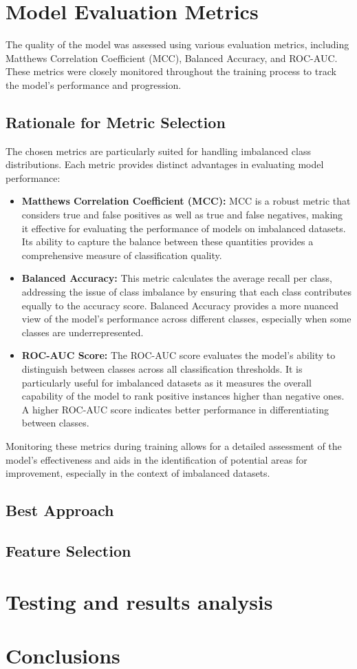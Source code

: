 \documentclass[10pt,twocolumn,letterpaper]{article}
\begin{document}
\section{Model Evaluation Metrics}

The quality of the model was assessed using various evaluation metrics, including Matthews Correlation Coefficient (MCC), Balanced Accuracy, and ROC-AUC. These metrics were closely monitored throughout the training process to track the model's performance and progression.

\subsection{Rationale for Metric Selection}

The chosen metrics are particularly suited for handling imbalanced class distributions. Each metric provides distinct advantages in evaluating model performance:

\begin{itemize}
    \item \textbf{Matthews Correlation Coefficient (MCC):} MCC is a robust metric that considers true and false positives as well as true and false negatives, making it effective for evaluating the performance of models on imbalanced datasets. 
    Its ability to capture the balance between these quantities provides a comprehensive measure of classification quality.
    \item \textbf{Balanced Accuracy:} This metric calculates the average recall per class, addressing the issue of class imbalance by ensuring that each class contributes equally to the accuracy score. 
    Balanced Accuracy provides a more nuanced view of the model's performance across different classes, especially when some classes are underrepresented.
    \item \textbf{ROC-AUC Score:} The ROC-AUC score evaluates the model's ability to distinguish between classes across all classification thresholds. 
    It is particularly useful for imbalanced datasets as it measures the overall capability of the model to rank positive instances higher than negative ones. A higher ROC-AUC score indicates better performance in differentiating between classes.
\end{itemize}

Monitoring these metrics during training allows for a detailed assessment of the model's effectiveness and aids in the identification of potential areas for improvement, especially in the context of imbalanced datasets.


\subsection{Best Approach}
\subsection{Feature Selection}
\section{Testing and results analysis}


\section{Conclusions}

{\small


}
\end{document}
